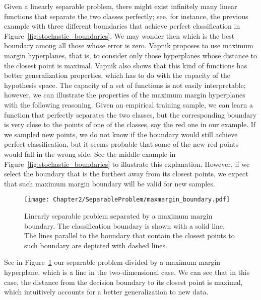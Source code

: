 Given a linearly separable problem, there might exist infinitely many linear functions that separate the two classes perfectly; see, for instance, the previous example with three different boundaries that achieve perfect classification in Figure~\ref{fig:stochastic_boundaries}.
We may wonder then which is the best boundary among all those whose error is zero. Vapnik proposes to use maximum margin hyperplanes, that is, to consider only those hyperplanes whose distance to the closest point is maximal.
Vapnik also shows that this kind of functions has better generalization properties, which has to do with the capacity of the hypothesis space.
%
The capacity of a set of functions is not easily interpretable; however, we can illustrate the properties of the maximum margin hyperplanes with the following reasoning. Given an empirical training sample, we can learn a function that perfectly separates the two classes, but the corresponding boundary is very close to the points of one of the classes, say the red one in our example. If we sampled new points, we do not know if the boundary would still achieve perfect classification, but it seems probable that some of the new red points would fall in the wrong side. See the middle example in Figure~\ref{fig:stochastic_boundaries} to illustrate this explanation.
%
However, if we select the boundary that is the furthest away from its closest points, we expect that such maximum margin boundary will be valid for new samples.
%
\begin{figure}[t!]
    \centering
    \texttt{[image: Chapter2/SeparableProblem/maxmargin\_boundary.pdf]}
    \caption{Linearly separable problem separated by a maximum margin boundary. The classification boundary is shown with a solid line. The lines parallel to the boundary that contain the closest points to such boundary are depicted with dashed lines.}
    \label{fig:maxmargin_boundary}
\end{figure}
%
See in Figure~\ref{fig:maxmargin_boundary} our separable problem divided by a maximum margin hyperplane, which is a line in the two-dimensional case. We can see that in this case, the distance from the decision boundary to its closest point is maximal, which intuitively accounts for a better generalization to new data.

